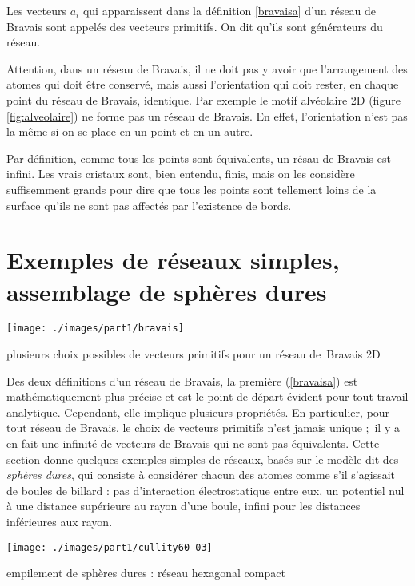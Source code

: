 Les vecteurs $a_i$ qui apparaissent dans la définition \ref{bravaisa} d'un
réseau de Bravais sont appelés des vecteurs primitifs. On dit qu'ils sont 
générateurs du réseau.

Attention, dans un réseau de Bravais, il ne doit pas y avoir que l'arrangement
des atomes qui doit être conservé, mais aussi l'orientation qui doit rester, en
chaque point du réseau de Bravais, identique. Par exemple le motif alvéolaire 2D
(figure \ref{fig:alveolaire}) ne forme pas un réseau de Bravais. En effet,
l'orientation n'est pas la même si on se place en un point et en un autre.

Par définition, comme tous les points sont équivalents, un résau de Bravais est
infini. Les vrais cristaux sont, bien entendu, finis, mais on les considère 
suffisemment grands pour dire que tous les points sont tellement loins de la
surface qu'ils ne sont pas affectés par l'existence de bords.

\section{Exemples de réseaux simples, assemblage de sphères dures}

\begin{marginfigure}
    \texttt{[image: ./images/part1/bravais]}
    \caption{plusieurs choix possibles de vecteurs primitifs pour un réseau de Bravais 2D}
    \label{fig:choixbravais2D}
\end{marginfigure}

Des deux définitions d'un réseau de Bravais, la première (\ref{bravaisa}) est 
mathématiquement plus précise et est le point de départ évident pour tout
travail analytique. Cependant, elle implique plusieurs propriétés. En
particulier, pour tout réseau de Bravais, le choix de vecteurs primitifs n'est
jamais unique ; il y a en fait une infinité de vecteurs de Bravais qui ne sont
pas équivalents. Cette section donne quelques exemples simples de réseaux, basés
sur le modèle dit des \emph{sphères dures}, qui consiste à considérer chacun des
atomes comme s'il s'agissait de boules de billard : pas d'interaction 
électrostatique entre eux, un potentiel nul à une distance supérieure au rayon
d'une boule, infini pour les distances inférieures aux rayon.

\begin{marginfigure}
    \texttt{[image: ./images/part1/cullity60-03]}
    \caption{empilement de sphères dures : réseau hexagonal compact}
    \label{fig:spheresdures}
\end{marginfigure}

